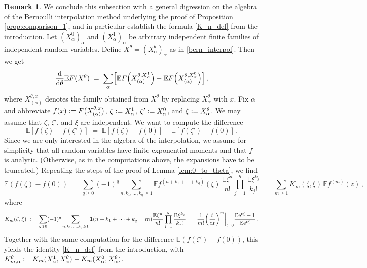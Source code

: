\documentclass[11pt]{article} %
\numberwithin{equation}{section}
\numberwithin{figure}{section}
\theoremstyle{plain} %
\theoremstyle{definition} %
\newtheorem{remark}[theorem]{Remark}
\newcommand{\f}[1]{\boldsymbol{\mathrm{#1}}} %
\newcommand{\E}{\mathbb{E}}
\newcommand{\me}{\mathrm{e}}
\newcommand{\dd}{\mathrm{d}}
\newcommand*{\deq}{\mathrel{\vcenter{\baselineskip0.65ex \lineskiplimit0pt \hbox{.}\hbox{.}}}=}
\renewcommand{\geq}{\geqslant}
\newcommand{\ind}[1]{\f 1 (#1)}
\newcommand{\pb}[1]{\bigl({#1}\bigr)}
\newcommand{\pB}[1]{\Bigl({#1}\Bigr)}
\newcommand{\pbb}[1]{\biggl({#1}\biggr)}
\newcommand{\q}[1]{[{#1}]}
\newcommand{\qB}[1]{\Bigl[{#1}\Bigr]}
\begin{document}
\begin{remark} \label{rem:Bernoulli}
We conclude this subsection with a general digression on the algebra of the Bernoulli interpolation method underlying the proof of Proposition \ref{prop:comparison_1}, and in particular establish the formula \eqref{K_n_def} from the introduction. Let $(X_\alpha^0)_{\alpha}$ and $(X_\alpha^1)_{\alpha}$ be arbitrary independent finite families of independent random variables. Define $X^\theta = (X^\theta_\alpha)_{\alpha}$ as in \eqref{bern_interpol}. Then we get
\begin{equation*}
\frac{\dd}{\dd \theta} \E F(X^\theta) \;=\; \sum_{\alpha} \qB{\E F\pB{X^{\theta,X_\alpha^1}_{(\alpha)}} - \E F\pB{X^{\theta,X_\alpha^0}_{(\alpha)}}}\,,
\end{equation*}
where $X^{\theta,x}_{(\alpha)}$ denotes the family obtained from $X^\theta$ by replacing $X_\alpha^\theta$ with $x$. Fix $\alpha$ and abbreviate $f(x) \deq F\pb{X^{\theta,x}_{(\alpha)}}$, $\zeta \deq X_\alpha^1$, $\zeta' \deq X_\alpha^0$, and $\xi \deq X_\alpha^\theta$. We may assume that $\zeta$,  $\zeta'$, and $\xi$ are independent. We want to compute the difference
\begin{equation*}
\E \q{f(\zeta) - f(\zeta')} \;=\; \E \q{f(\zeta) - f(0)}  - \E \q{f(\zeta') - f(0)}\,.
\end{equation*}
Since we are only interested in the algebra of the interpolation, we assume for simplicity that all random variables have finite exponential moments and that $f$ is analytic. (Otherwise, as in the computations above, the expansions have to be truncated.)
Repeating the steps of the proof of Lemma \ref{lem:0_to_theta}, we find
\begin{equation*}
\E (f(\zeta) - f(0))
\;=\; \sum_{q \geq 0} (-1)^q \sum_{n, k_1, \dots, k_q \geq 1} \E f^{(n + k_1 + \cdots + k_q)}(\xi) \, \frac{\E \zeta^{n}}{n!} \prod_{j = 1}^q \frac{\E \xi^{k_j}}{k_j!}
\;=\; \sum_{m \geq 1} K_m(\zeta,\xi) \, \E f^{(m)}(z)\,,
\end{equation*}
where
\begin{equation*}
K_m(\zeta,\xi) \;\deq\; \sum_{q \geq 0} (-1)^q \sum_{n, k_1, \dots, k_q \geq 1} \ind{n + k_1 + \cdots + k_q = m} \frac{\E \zeta^n}{n!}\prod_{j = 1}^q \frac{\E \xi^{k_j}}{k_j!} \;=\; \frac{1}{m!} \pbb{\frac{\dd}{\dd t}}^m \bigg\vert_{t = 0} \frac{\E \me^{t \zeta} - 1}{\E \me^{t \xi}}\,.
\end{equation*}
Together with the same computation for the difference $\E (f(\zeta') - f(0))$, this yields the identity \eqref{K_n_def} from the introduction, with $K_{m,\alpha}^\theta \deq K_m(X_\alpha^1,X_\alpha^\theta) - K_m(X_\alpha^0,X_\alpha^\theta)$.
\end{remark}
\end{document}
